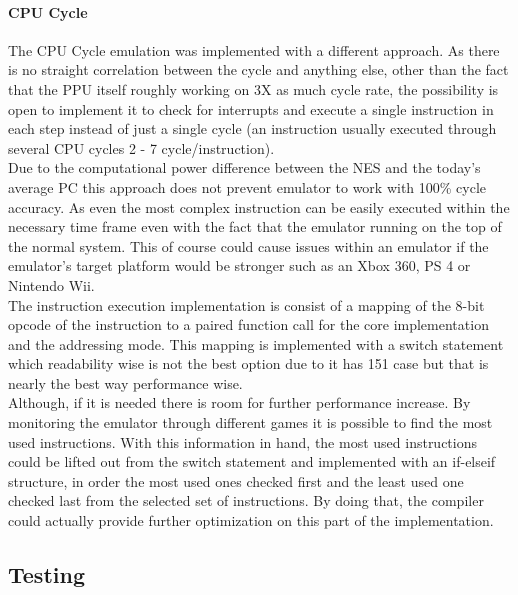 \documentclass[]{report}
\begin{document}
\paragraph{CPU Cycle}
The CPU Cycle emulation was implemented with a different approach. As there is no straight correlation between the cycle and anything else, other than the fact that the PPU itself roughly working on 3X as much cycle rate, the possibility is open to implement it to check for interrupts and  execute a single instruction in each step instead of just a single cycle (an instruction usually executed through several CPU cycles 2 - 7 cycle/instruction). 
\\
Due to the computational power difference between the NES and the today's average PC this approach does not prevent emulator to work with 100\% cycle accuracy. As even the most complex instruction can be easily executed within the necessary time frame even with the fact that the emulator running on the top of the normal system. This of course could cause issues within an emulator if the emulator's target platform would be stronger such as an Xbox 360, PS 4 or Nintendo Wii.
\\
The instruction execution implementation is consist of a mapping of the 8-bit opcode of the instruction to a paired function call for the core implementation and the addressing mode. This mapping is implemented with a switch statement which readability wise is not the best option due to it has 151 case but that is nearly the best way performance wise.
\\
Although, if it is needed there is room for further performance increase. By monitoring the emulator through different games it is possible to find the most used instructions. With this information in hand, the most used instructions could be lifted out from the switch statement and implemented with an if-elseif structure, in order the most used ones checked first and the least used one checked last from the selected set of instructions. By doing that, the compiler could actually provide further optimization on this part of the implementation.


\subsection{Testing}
\end{document}

